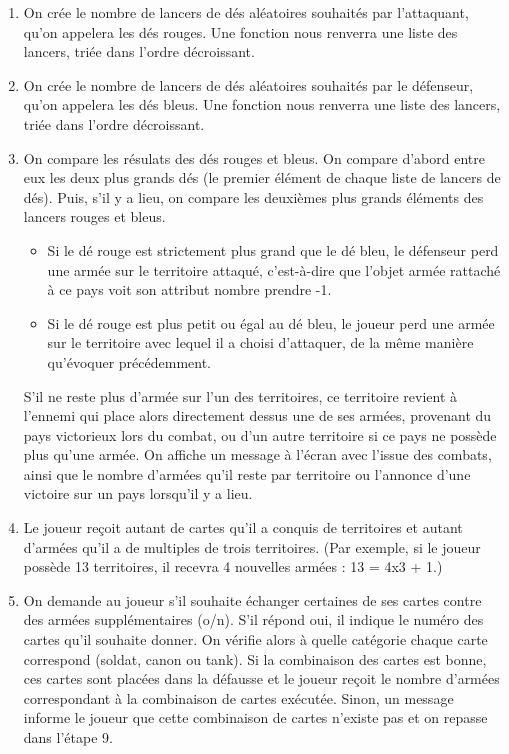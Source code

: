 \begin{enumerate}
    \item On crée le nombre de lancers de dés aléatoires souhaités par l'attaquant, qu'on appelera les dés rouges. Une fonction nous renverra une liste des lancers, triée dans l'ordre décroissant.
    
    \item On crée le nombre de lancers de dés aléatoires souhaités par le défenseur, qu'on appelera les dés bleus. Une fonction nous renverra une liste des lancers, triée dans l'ordre décroissant.
    
    \item On compare les résulats des dés rouges et bleus. On compare d'abord entre eux les deux plus grands dés (le premier élément de chaque liste de lancers de dés). Puis, s'il y a lieu, on compare les deuxièmes plus grands éléments des lancers rouges et bleus.
    \begin{itemize}
        \item Si le dé rouge est strictement plus grand que le dé bleu, le défenseur perd une armée sur le territoire attaqué, c'est-à-dire que l'objet armée rattaché à ce pays voit son attribut nombre prendre -1.
        \item Si le dé rouge est plus petit ou égal au dé bleu, le joueur perd une armée sur le territoire avec lequel il a choisi d'attaquer, de la même manière qu'évoquer précédemment.
    \end{itemize}
    S'il ne reste plus d'armée sur l'un des territoires, ce territoire revient à l'ennemi qui place alors directement dessus une de ses armées, provenant du pays victorieux lors du combat, ou d'un autre territoire si ce pays ne possède plus qu'une armée.
    \newline
    On affiche un message à l'écran avec l'issue des combats, ainsi que le nombre d'armées qu'il reste par territoire ou l'annonce d'une victoire sur un pays lorsqu'il y a lieu.
    
    \item Le joueur reçoit autant de cartes qu'il a conquis de territoires et autant d'armées qu'il a de multiples de trois territoires. (Par exemple, si le joueur possède 13 territoires, il recevra 4 nouvelles armées : 13 = 4x3 + 1.) %
    
    \item On demande au joueur s'il souhaite échanger certaines de ses cartes contre des armées supplémentaires (o/n). S'il répond oui, il indique le numéro des cartes qu'il souhaite donner. On vérifie alors à quelle catégorie chaque carte correspond (soldat, canon ou tank). Si la combinaison des cartes est bonne, ces cartes sont placées dans la défausse et le joueur reçoit le nombre d'armées correspondant à la combinaison de cartes exécutée. Sinon, un message informe le joueur que cette combinaison de cartes n'existe pas et on repasse dans l'étape 9.
    

\end{enumerate}
